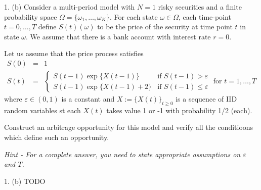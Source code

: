 \documentclass[11pt,a4paper]{article}
\begin{document}
\begin{question}{1. (b)}
  Consider a multi-period model with $N=1$ risky securities and a finite probability space $\Omega=\{\omega_1,\dots,\omega_K\}$. For each state $\omega\in\Omega$, each time-point $t=0,\dots,T$ define $S(t)(\omega)$ to be the price of the security at time point $t$ in state $\omega$. We assume that there is a bank account with interest rate $r=0$.
  \par Let us assume that the price process satisfies
  \[\begin{array}{rcl}
    S(0)&=&1\\
    S(t)&=&\begin{cases}
      S(t-1)\exp\{X(t-1)\}&\text{if }S(t-1)>\varepsilon\\
      S(t-1)\exp\{X(t-1)+2\}&\text{if }S(t-1)\leq\varepsilon
  \end{cases}\text{ for }t=1,\dots,T
  \end{array}\]
  where $\varepsilon\in(0,1)$ is a constant and $X:=\{X(t)\}_{t\geq0}$ is a sequence of IID random variables st each $X(t)$ takes value 1 or -1 with probability 1/2 (each).
  \par Construct an arbitrage opportunity for this model and verify all the conditioons which define such an opportunity.
  \par \textit{Hint - For a complete answer, you need to state appropriate assumptions on $\varepsilon$ and $T$.}
\end{question}

\begin{answer}{1. (b)}
  TODO
\end{answer}
\end{document}
